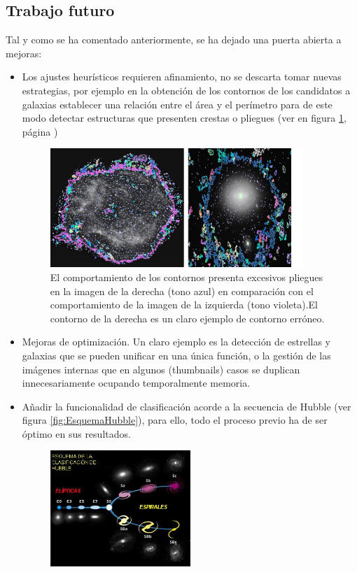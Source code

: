 	\subsection{Trabajo futuro}
	Tal y como se ha comentado anteriormente, se ha dejado una puerta abierta a mejoras:
	\begin{itemize} 
	\item Los ajustes heurísticos requieren afinamiento, no se descarta tomar nuevas estrategias, por ejemplo en la obtención de los contornos de los candidatos a galaxias establecer una relación entre el área y el perímetro para de este modo detectar estructuras que presenten crestas o pliegues (ver en figura \ref{fig:MembraneNebulae}, página \pageref{fig:MembraneNebulae})
		\begin{figure}[!htb]
			\centering
			\includegraphics[width=0.9\textwidth]{images/nebulaMembrana2.jpg}
			\caption{\label{fig:MembraneNebulae}{\small El comportamiento de los contornos presenta excesivos pliegues en la imagen de la derecha (tono azul) en comparación con el comportamiento de la imagen de la izquierda (tono violeta).El contorno de la derecha es un claro ejemplo de contorno erróneo.}}
		\end{figure}
	\item Mejoras de optimización. Un claro ejemplo es la detección de estrellas y galaxias que se pueden unificar en una única función, o la gestión de las imágenes internas que en algunos (thumbnails) casos se duplican innecesariamente ocupando temporalmente memoria.
	\item Añadir la funcionalidad de clasificación acorde a la secuencia de Hubble (ver figura \ref{fig:EsquemaHubble}), para ello, todo el proceso previo ha de ser óptimo en sus resultados.
				\begin{figure}[!htb]
					\centering
					\includegraphics[width=0.5\textwidth]{images/EsquemaHubble.jpg}

\end{figure}
\end{itemize}
